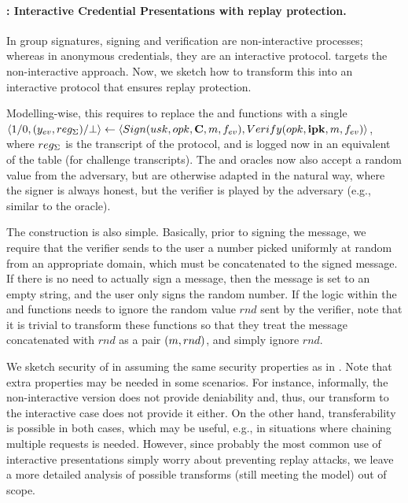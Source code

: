 \paragraph{\CUASGenInt: Interactive Credential Presentations with replay
  protection.}
%
In group signatures, signing and verification are non-interactive processes;
whereas in anonymous credentials, they are an interactive protocol. \CUASGen
targets the non-interactive approach. Now, we sketch how to transform this into
an interactive protocol that ensures replay protection.

Modelling-wise, this requires to replace the \Sign and \Verify functions with
a single $\langle 1/0,(y_{ev},reg_{\Sigma})/\bot \rangle \gets \langle
Sign(usk,opk,\mathbf{C},m,f_{ev}), Verify(opk,\mathbf{ipk},m,f_{ev}) \rangle$,
where $reg_{\Sigma}$ is the transcript of the protocol, and is logged now in
an equivalent of the \SIG table (\CSIG for challenge transcripts). The \SIGN
and \CHALb oracles now also accept a random value from the adversary, but
are otherwise adapted in the natural way, where the signer is always honest, but
the verifier is played by the adversary (e.g., similar to the \OBTAIN oracle).

The construction is also simple. Basically, prior to signing the message, we
require that the verifier sends to the user a number picked uniformly at random
from an appropriate domain, which must be concatenated to the signed message. If
there is no need to actually sign a message, then the message is set to an empty
string, and the user only signs the random number.
%
If the logic within the \feval and \finsp functions needs to ignore the random
value $rnd$ sent by the verifier, note that it is trivial to transform these
functions so that they treat the message concatenated with $rnd$ as a pair
$(m,rnd)$, and simply ignore $rnd$.

We sketch security of \CUASGenInt in  assuming
the same security properties as in \UAS. Note that extra properties may be
needed in some scenarios. For instance, informally, the non-interactive version
does not provide deniability and, thus, our transform to the interactive case
does not provide it either. On the other hand, transferability is possible in
both cases, which may be useful, e.g., in situations where chaining multiple
requests is needed.
%
However, since probably the most common use of interactive presentations simply
worry about preventing replay attacks, we leave a more detailed analysis of
possible transforms (still meeting the \UAS model) out of scope.

